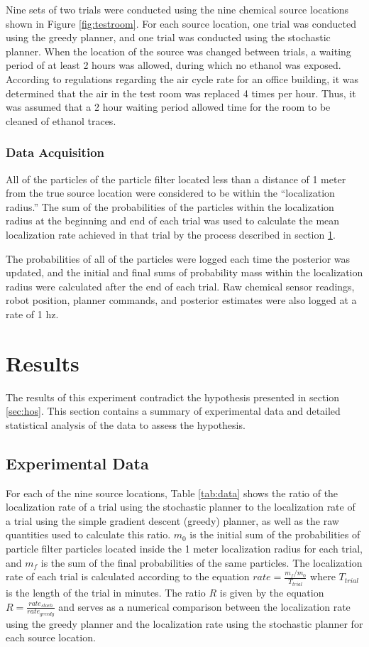\documentclass[submit, 12pt]{aiaa-pretty-modified}
\begin{document}
Nine sets of two trials were conducted using the nine chemical source
locations shown in Figure \ref{fig:testroom}.  For each source
location, one trial was conducted using the greedy planner, and one trial
was conducted using the stochastic planner.  When the location of the source was changed between trials, a waiting period of at least 2 hours
was allowed, during which no ethanol was exposed. According to regulations regarding the air
cycle rate for an office building, it was determined that the air in
the test room was replaced 4 times per hour.  Thus, it was assumed that a 2 hour waiting
period allowed time for the room to be cleaned of ethanol traces.

\subsubsection{Data Acquisition}
All of the particles of the particle filter located less than a distance of 1 meter from the
true source location were considered to be within the ``localization
radius.''  The sum of the probabilities of the particles within the
localization radius at the beginning and end of each trial was used to
calculate the mean localization rate achieved in that trial by the
process described in section \ref{sec:results}.

The probabilities of all of the particles were logged each time the
posterior was updated, and the initial and final sums of probability
mass within the localization radius were calculated after the
end of each trial. Raw chemical sensor readings, robot position, planner commands, and
posterior estimates were also logged at a rate of 1 hz.

\newpage

\section{Results}
\label{sec:results}
The results of this experiment contradict the hypothesis presented in
section \ref{sec:hos}.  This section contains a summary of experimental data
and detailed statistical analysis of the data to assess the
hypothesis.

\subsection{Experimental Data}
For each of the nine source locations, Table \ref{tab:data} shows the
ratio of the localization rate of
a trial using the stochastic planner to the localization rate of
a trial using the simple gradient descent (greedy) planner, as well as
the raw quantities used to calculate this ratio. $m_0$ is the initial sum of
the probabilities of particle filter particles located inside the 1
meter localization radius for each trial, and $m_f$ is the sum
of the final probabilities of the same particles. The localization rate of
each trial is calculated according to the equation $rate =
\frac{m_f/m_0}{T_{trial}}$ where $T_{trial}$ is the length of the
trial in minutes.  The ratio $R$ is given by the equation $R =
\frac{rate_{stoch}}{rate_{greedy}}$ and serves as a numerical
comparison between the localization rate using the greedy planner and
the localization rate using the stochastic planner for each source location.
\end{document}

